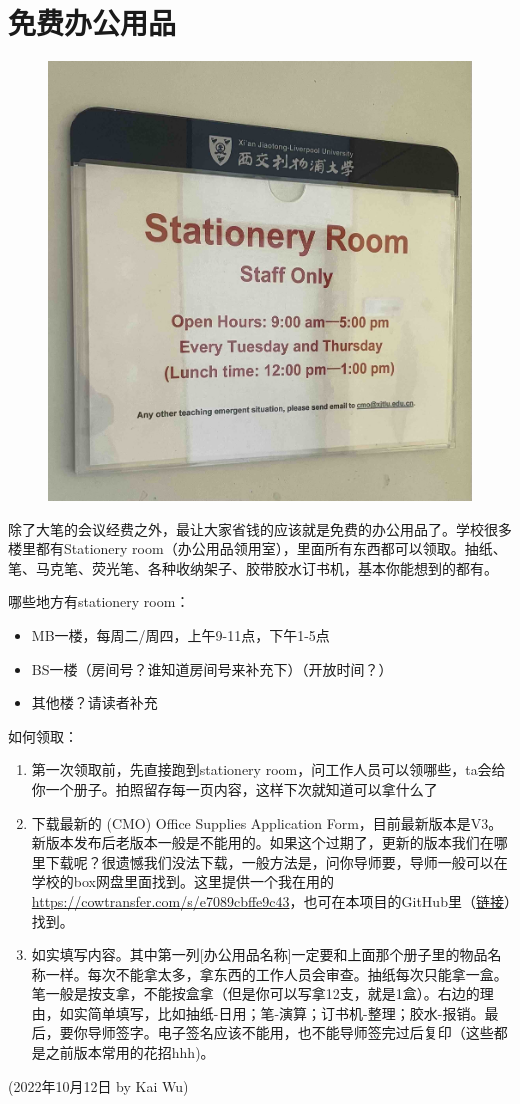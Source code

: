 \section{免费办公用品}
\begin{figure}[H]
    \centering
    \includegraphics[width=0.6\columnwidth]{author-folder/Kai.Wu/stationery_room.jpg}
\end{figure}

除了大笔的会议经费之外，最让大家省钱的应该就是免费的办公用品了。学校很多楼里都有Stationery room（办公用品领用室），里面所有东西都可以领取。抽纸、笔、马克笔、荧光笔、各种收纳架子、胶带胶水订书机，基本你能想到的都有。

\vspace{5mm}
哪些地方有stationery room：
\begin{itemize}
    \item MB一楼，每周二/周四，上午9-11点，下午1-5点
    \item BS一楼（房间号？谁知道房间号来补充下）（开放时间？）
    \item 其他楼？请读者补充
\end{itemize}

\vspace{5mm}
如何领取：
\begin{enumerate}
    \item 第一次领取前，先直接跑到stationery room，问工作人员可以领哪些，ta会给你一个册子。拍照留存每一页内容，这样下次就知道可以拿什么了
    \item 下载最新的 (CMO) Office Supplies Application Form，目前最新版本是V3。新版本发布后老版本一般是不能用的。如果这个过期了，更新的版本我们在哪里下载呢？很遗憾我们没法下载，一般方法是，问你导师要，导师一般可以在学校的box网盘里面找到。这里提供一个我在用的\url{https://cowtransfer.com/s/e7089cbffe9c43}，也可在本项目的GitHub里（\href{https://github.com/kaiwu-astro/xp_pgrs_unofficial_guide/tree/main/fileshare}{链接}）找到。
    \item 如实填写内容。其中第一列[办公用品名称]一定要和上面那个册子里的物品名称一样。每次不能拿太多，拿东西的工作人员会审查。抽纸每次只能拿一盒。笔一般是按支拿，不能按盒拿（但是你可以写拿12支，就是1盒）。右边的理由，如实简单填写，比如抽纸-日用；笔-演算；订书机-整理；胶水-报销。最后，要你导师签字。电子签名应该不能用，也不能导师签完过后复印（这些都是之前版本常用的花招hhh)。
\end{enumerate}


\begin{flushright}
(2022年10月12日 by Kai Wu)
\end{flushright}